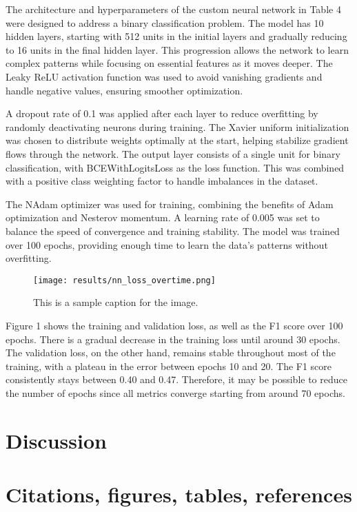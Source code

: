 \documentclass{article} %
\begin{document}
The architecture and hyperparameters of the custom neural network in Table 4 were designed to address a binary classification problem. The model has 10 hidden layers, starting with 512 units in the initial layers and gradually reducing to 16 units in the final hidden layer. This progression allows the network to learn complex patterns while focusing on essential features as it moves deeper. The Leaky ReLU activation function was used to avoid vanishing gradients and handle negative values, ensuring smoother optimization.

A dropout rate of 0.1 was applied after each layer to reduce overfitting by randomly deactivating neurons during training. The Xavier uniform initialization was chosen to distribute weights optimally at the start, helping stabilize gradient flows through the network. The output layer consists of a single unit for binary classification, with BCEWithLogitsLoss as the loss function. This was combined with a positive class weighting factor to handle imbalances in the dataset.

The NAdam optimizer was used for training, combining the benefits of Adam optimization and Nesterov momentum. A learning rate of 0.005 was set to balance the speed of convergence and training stability. The model was trained over 100 epochs, providing enough time to learn the data's patterns without overfitting.


\begin{figure}[ht!]
   \centering
   \texttt{[image: results/nn\_loss\_overtime.png]}
   \caption{This is a sample caption for the image.}
   \label{fig:sample-image}
\end{figure}

Figure 1 shows the training and validation loss, as well as the F1 score over 100 epochs. There is a gradual decrease in the training loss until around 30 epochs. The validation loss, on the other hand, remains stable throughout most of the training, with a plateau in the error between epochs 10 and 20. The F1 score consistently stays between 0.40 and 0.47. Therefore, it may be possible to reduce the number of epochs since all metrics converge starting from around 70 epochs.


\section{Discussion}

\section{Citations, figures, tables, references}
\label{others}
\end{document}
